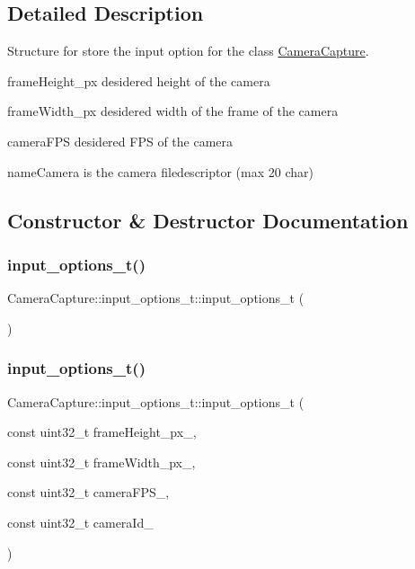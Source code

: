 \subsection{Detailed Description}
Structure for store the input option for the class \mbox{\hyperlink{class_camera_capture}{Camera\+Capture}}. 

frame\+Height\+\_\+px desidered height of the camera

frame\+Width\+\_\+px desidered width of the frame of the camera

camera\+F\+PS desidered F\+PS of the camera

name\+Camera is the camera filedescriptor (max 20 char) 

\subsection{Constructor \& Destructor Documentation}
\mbox{\label{struct_camera_capture_1_1input__options__t_a1e74abe6a5246461224f73fa8173f708}} 
\subsubsection{\texorpdfstring{input\_options\_t()}{input\_options\_t()}\hspace{0.1cm}{\footnotesize\ttfamily [1/3]}}
{\footnotesize\ttfamily Camera\+Capture\+::input\+\_\+options\+\_\+t\+::input\+\_\+options\+\_\+t (\begin{DoxyParamCaption}{ }\end{DoxyParamCaption})}

\mbox{\label{struct_camera_capture_1_1input__options__t_abe7b3c94b1390d282fbcb3f96e04851a}} 
\subsubsection{\texorpdfstring{input\_options\_t()}{input\_options\_t()}\hspace{0.1cm}{\footnotesize\ttfamily [2/3]}}
{\footnotesize\ttfamily Camera\+Capture\+::input\+\_\+options\+\_\+t\+::input\+\_\+options\+\_\+t (\begin{DoxyParamCaption}\item[{const uint32\+\_\+t}]{frame\+Height\+\_\+px\+\_\+,  }\item[{const uint32\+\_\+t}]{frame\+Width\+\_\+px\+\_\+,  }\item[{const uint32\+\_\+t}]{camera\+F\+P\+S\+\_\+,  }\item[{const uint32\+\_\+t}]{camera\+Id\+\_\+ }\end{DoxyParamCaption})}

